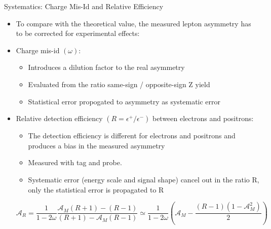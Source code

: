 \documentclass[t, 8pt]{beamer}
\begin{document}
\begin{frame}{Systematics: Charge Mis-Id and Relative Efficiency}
  \begin{itemize}
    \item To compare with the theoretical value, the measured lepton asymmetry has to be corrected for experimental effects:
      \item Charge mis-id $(\omega)$: 
      \begin{itemize}
        \item Introduces a dilution factor to the real asymmetry
        \item Evaluated from the ratio same-sign / opposite-sign Z yield
        \item Statistical error propogated to asymmetry as systematic error
      \end{itemize}
      \item Relative detection efficiency $(R = \epsilon^+/\epsilon^-)$ between electrons and positrons: 
      \begin{itemize}
        \item The detection efficiency is different for electrons and positrons and produces a bias in the measured asymmetry
        \item Measured with tag and probe.
        \item Systematic error (energy scale and signal shape) cancel out in the ratio R, only the statistical error is propagated to R
      \end{itemize}
      \begin{center}
      \begin{equation}
        \mathcal{A}_R=
          \frac{1}{1-2\omega}\frac{ \mathcal{A}_M\left(R+1\right) - \left(R-1\right)}{\left(R+1\right)-\mathcal{A}_M \left(R-1\right)}
          \simeq 
          \frac{1}{1-2\omega}\left(\mathcal{A}_M -\frac{\left(R-1\right)\left(1-\mathcal{A}_M^2\right)}{2}\right)
      \end{equation}
      \end{center}
  \end{itemize}
\end{frame}
\end{document}
